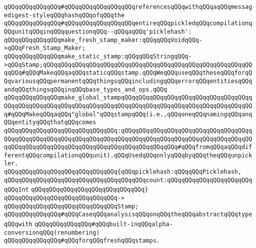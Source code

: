 \verb|qQQqqQQqqQQqqQQq#qQQqqQQqqQQqqQQqqQQqreferencesqQQqwithqQQqaqQQqmessagedigest-styleqQQqhashqQQqofqQQqthe|\newline
\verb|qQQqqQQqqQQqqQQq#qQQqqQQqqQQqqQQqqQQqentireqQQqpickledqQQqcompilationqQQqunitqQQqinqQQqquestionqQQq--qQQqaqQQq'picklehash':|\newline
\newline
\verb|qQQqqQQqqQQqqQQqmake_fresh_stamp_maker:qQQqqQQqVoidqQQq->qQQqFresh_Stamp_Maker;|\newline
\newline
\verb|qQQqqQQqqQQqqQQqmake_static_stamp:qQQqqQQqStringqQQq->qQQqStamp;qQQqqQQqqQQqqQQqqQQqqQQqqQQqqQQqqQQqqQQqqQQqqQQqqQQqqQQqqQQqqQQq#qQQqMakeqQQqaqQQqstaticqQQqstamp.qQQqWeqQQquseqQQqtheseqQQqforqQQqvariousqQQqpermanentqQQqthingsqQQqincludingqQQqerrorqQQqentitiesqQQqandqQQqthingsqQQqinqQQqbase_types_and_ops.qQQq|\newline
\newline
\verb|qQQqqQQqqQQqqQQqmake_global_stampqQQqqQQqqQQqqQQqqQQqqQQqqQQqqQQqqQQqqQQqqQQqqQQqqQQqqQQqqQQqqQQqqQQqqQQqqQQqqQQqqQQqqQQqqQQqqQQqqQQqqQQqqQQq#qQQqMakeqQQqaqQQq"global"qQQqstampqQQq(i.e.,qQQqoneqQQqnamingqQQqanqQQqentityqQQqthatqQQqcomes|\newline
\verb|qQQqqQQqqQQqqQQqqQQqqQQqqQQqqQQq:qQQqqQQqqQQqqQQqqQQqqQQqqQQqqQQqqQQqqQQqqQQqqQQqqQQqqQQqqQQqqQQqqQQqqQQqqQQqqQQqqQQqqQQqqQQqqQQqqQQqqQQqqQQqqQQqqQQqqQQqqQQqqQQqqQQqqQQqqQQqqQQqqQQqqQQqqQQq#qQQqfromqQQqaqQQqdifferentqQQqcompilationqQQqunit).qQQqUsedqQQqonlyqQQqbyqQQqtheqQQqunpickler.|\newline
\verb|qQQqqQQqqQQqqQQqqQQqqQQqqQQqqQQq{qQQqpicklehash:qQQqqQQqPicklehash,|\newline
\verb|qQQqqQQqqQQqqQQqqQQqqQQqqQQqqQQqqQQqqQQqcount:qQQqqQQqqQQqqQQqqQQqqQQqqQQqInt|\newline
\verb|qQQqqQQqqQQqqQQqqQQqqQQqqQQqqQQq}|\newline
\verb|qQQqqQQqqQQqqQQqqQQqqQQqqQQqqQQq->|\newline
\verb|qQQqqQQqqQQqqQQqqQQqqQQqqQQqqQQqStamp;|\newline
\newline
\newline
\verb|qQQqqQQqqQQqqQQq#qQQqCaseqQQqanalysisqQQqonqQQqtheqQQqabstractqQQqtypeqQQqwith|\newline
\verb|qQQqqQQqqQQqqQQq#qQQqbuilt-inqQQqalpha-conversionqQQq(renumbering)|\newline
\verb|qQQqqQQqqQQqqQQq#qQQqforqQQqfreshqQQqstamps.|\newline
